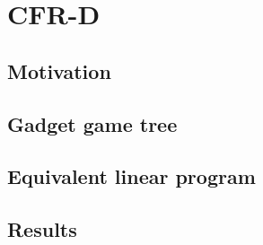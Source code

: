 \chapter{CFR-D}

\section{Motivation}

\section{Gadget game tree}

\section{Equivalent linear program}

\section{Results}
